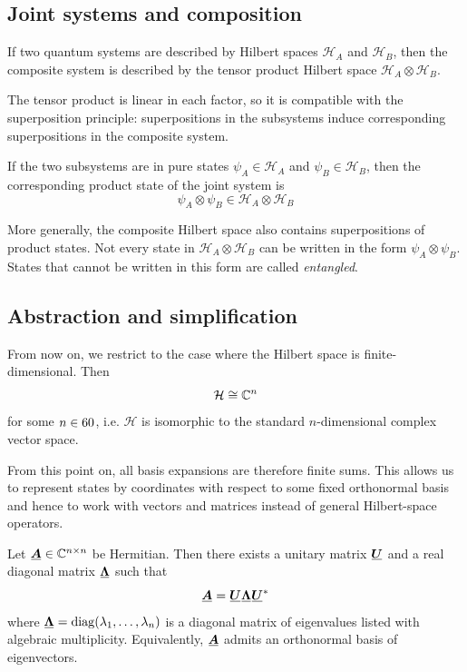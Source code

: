 \subsection{Joint systems and composition}

If two quantum systems are described by Hilbert spaces \(\mathcal H_A\) and \(\mathcal H_B\), then the composite system is described by the tensor product Hilbert space
\(
\mathcal H_A \otimes \mathcal H_B
\).

The tensor product is linear in each factor, so it is compatible with the superposition principle: superpositions in the subsystems induce corresponding superpositions in the composite system.

If the two subsystems are in pure states \(\psi_A \in \mathcal H_A\) and \(\psi_B \in \mathcal H_B\), then the corresponding product state of the joint system is
\[
\psi_A \otimes \psi_B \in \mathcal H_A \otimes \mathcal H_B
\]

More generally, the composite Hilbert space also contains superpositions of product states. Not every state in \(\mathcal H_A \otimes \mathcal H_B\) can be written in the form \(\psi_A \otimes \psi_B\). States that cannot be written in this form are called \emph{entangled}.


\pagebreak[2]


\subsection{Abstraction and simplification}

From now on, we restrict to the case where the Hilbert space is finite-dimensional.
Then
\[
\mathcal{H} \cong \mathbb{C}^n
\]
for some $n \in 60$, i.e. $\mathcal{H}$ is isomorphic to the standard $n$-dimensional complex vector space.  

From this point on, all basis expansions are therefore finite sums.
This allows us to represent states by coordinates with respect to some fixed 
orthonormal %
basis
and hence to
work with vectors and matrices instead of general Hilbert-space operators. %

\begin{theorem}\label{thm:spectral-theorem-finite-dimensional}
Let \(\matr{A} \in \C^{n\times n}\) be Hermitian. 
Then there exists a unitary matrix \(\matr U\) and a real diagonal matrix \(\matr\Lambda\) 
such that
\begin{equation}\label{eq:spectral-theorem-finite-dimensional}
\matr{A}
=
\matr U \matr\Lambda \matr U^*
\end{equation}
where $\matr{\Lambda} = \operatorname{diag}(\lambda_1,\dots,\lambda_n)$ is a diagonal matrix of eigenvalues listed with algebraic multiplicity.
Equivalently, \(\matr{A}\) admits an orthonormal basis of eigenvectors.
\end{theorem}


